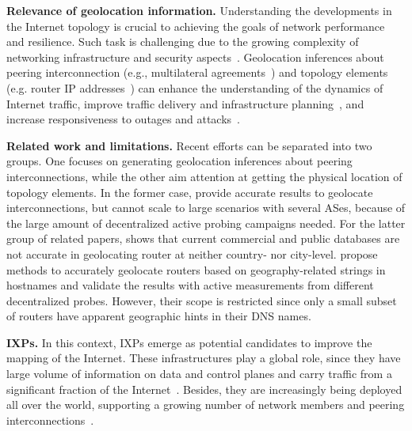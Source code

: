 	\textbf{Relevance of geolocation information.} Understanding the developments in the Internet topology is crucial to achieving the goals of network performance and resilience. Such task is challenging due to the growing complexity of networking infrastructure and security aspects~\cite{Giotsas:2015:MPI:2716281.2836122}. Geolocation inferences about peering interconnection (e.g., multilateral agreements~\cite{Giotsas:2013}) and topology elements (e.g. router IP addresses~\cite{8002903,Huffaker:2014:DDR:2656877.2656879}) can enhance the understanding of the dynamics of Internet traffic, improve traffic delivery and infrastructure planning~\cite{Calder:2013:MEG:2504730.2504754}, and increase responsiveness to outages and attacks~\cite{Giotsas:2017:DPI:3098822.3098855, marcos:2018:dynamix}. 


	\textbf{Related work and limitations.} Recent efforts can be separated into two groups. One focuses on generating geolocation inferences about peering interconnections, while the other aim attention at getting the physical location of topology elements. In the former case, \cite{Giotsas:2015:MPI:2716281.2836122, Augustin:2009:IM:1644893.1644934} provide accurate results to geolocate interconnections, but cannot scale to large scenarios with several ASes, because of the large amount of decentralized active probing campaigns needed. For the latter group of related papers, \cite{Gharaibeh:2017:LRG:3131365.3131380} shows that current commercial and public databases are not accurate in geolocating router at neither country- nor city-level. \cite{Huffaker:2014:DDR:2656877.2656879, 8002903} propose methods to accurately geolocate routers based on geography-related strings in hostnames and validate the results with active measurements from different decentralized probes. However, their scope is restricted since only a small subset of routers have apparent geographic hints in their DNS names.

	\textbf{IXPs.} In this context, IXPs emerge as potential candidates to improve the mapping of the Internet. These infrastructures play a global role, since they have large volume of information on data and control planes and carry traffic from a significant fraction of the Internet~\cite{Chatzis:2013:BUL:2504730.2504746}. Besides, they are increasingly being deployed all over the world, supporting a growing number of network members and peering interconnections~\cite{Giotsas:2017:DPI:3098822.3098855}.
	

